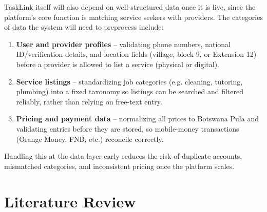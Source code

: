 \documentclass[12pt]{article}
\begin{document}
TaskLink itself will also depend on well-structured data once it is live, since the platform's core function is matching service seekers with providers. The categories of data the system will need to preprocess include:
\begin{enumerate}
\item \textbf{User and provider profiles} -- validating phone numbers, national ID/verification details, and location fields (village, block 9, or Extension 12) before a provider is allowed to list a service (physical or digital).
\item \textbf{Service listings} -- standardizing job categories (e.g. cleaning, tutoring, plumbing) into a fixed taxonomy so listings can be searched and filtered reliably, rather than relying on free-text entry.
\item \textbf{Pricing and payment data} -- normalizing all prices to Botswana Pula and validating entries before they are stored, so mobile-money transactions (Orange Money, FNB, etc.) reconcile correctly.
\end{enumerate}
Handling this at the data layer early reduces the risk of duplicate accounts, mismatched categories, and inconsistent pricing once the platform scales.

\section{Literature Review}
\end{document}
